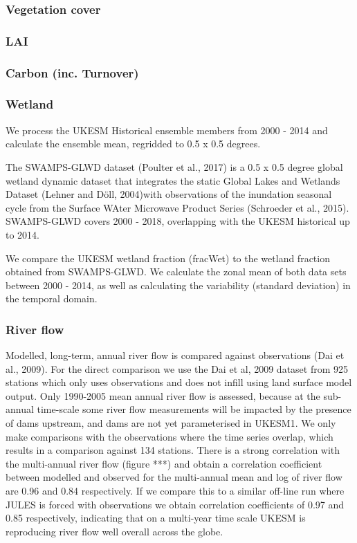 \documentclass[bg, manuscript]{copernicus}
\begin{document}
\subsubsection{Vegetation cover}

\subsubsection{LAI}

\subsubsection{Carbon (inc. Turnover)}

\subsubsection{Wetland}
We process the UKESM Historical ensemble members from 2000 - 2014 and calculate the ensemble mean, regridded to 0.5 x 0.5 degrees.

The SWAMPS-GLWD dataset (Poulter et al., 2017) is a 0.5 x 0.5 degree global wetland dynamic dataset that integrates the static Global Lakes and Wetlands Dataset (Lehner and Döll, 2004)with observations of the inundation seasonal cycle from the Surface WAter Microwave Product Series (Schroeder et al., 2015). SWAMPS-GLWD covers 2000 - 2018, overlapping with the UKESM historical up to 2014.

We compare the UKESM wetland fraction (fracWet) to the wetland fraction obtained from SWAMPS-GLWD. We calculate the zonal mean of both data sets between 2000 - 2014, as well as calculating the variability (standard deviation) in the temporal domain.

\subsubsection{River flow}
Modelled, long-term, annual river flow is compared against observations (Dai et al., 2009). For the direct comparison we use the Dai et al, 2009 dataset from 925 stations which only uses observations and does not infill using land surface model output. Only 1990-2005 mean annual river flow is assessed, because at the sub-annual time-scale some river flow measurements will be impacted by the presence of dams upstream, and dams are not yet parameterised in UKESM1. We only make comparisons with the observations where the time series overlap, which results in a comparison against 134 stations. There is a strong correlation with the multi-annual river flow (figure ***) and obtain a correlation coefficient between modelled and observed  for the multi-annual mean and  log of river flow are 0.96 and 0.84 respectively. If we compare this to a similar off-line run where JULES is forced with observations we obtain correlation coefficients of 0.97 and 0.85 respectively, indicating that on a multi-year time scale UKESM is reproducing river flow well overall across the globe.
\end{document}
